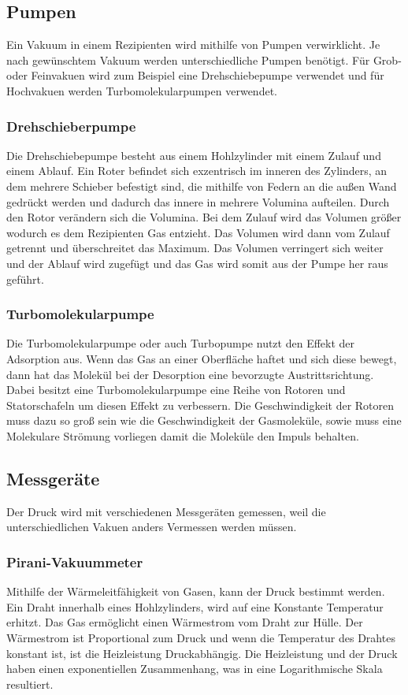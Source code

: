 \subsection{Pumpen}
Ein Vakuum in einem Rezipienten wird mithilfe von Pumpen verwirklicht. Je nach gewünschtem Vakuum werden unterschiedliche Pumpen benötigt. Für Grob- oder Feinvakuen wird zum Beispiel eine Drehschiebepumpe verwendet und für Hochvakuen werden Turbomolekularpumpen verwendet.
\subsubsection{Drehschieberpumpe}
Die Drehschiebepumpe besteht aus einem Hohlzylinder mit einem Zulauf und einem Ablauf. Ein Roter befindet sich exzentrisch im inneren des Zylinders, an dem mehrere Schieber befestigt sind, die mithilfe von Federn an die außen Wand gedrückt werden und dadurch das innere in mehrere Volumina aufteilen. Durch den Rotor verändern sich die Volumina. Bei dem Zulauf wird das Volumen größer wodurch es dem Rezipienten Gas entzieht. Das Volumen wird dann vom Zulauf getrennt und überschreitet das Maximum. Das Volumen verringert sich weiter und der Ablauf wird zugefügt und das Gas wird somit aus der Pumpe her raus geführt.

\subsubsection{Turbomolekularpumpe}
Die Turbomolekularpumpe oder auch Turbopumpe nutzt den Effekt der Adsorption aus. Wenn das Gas an einer Oberfläche haftet und sich diese bewegt, dann hat das Molekül bei der Desorption eine bevorzugte Austrittsrichtung. Dabei besitzt eine Turbomolekularpumpe eine Reihe von Rotoren und Statorschafeln um diesen Effekt zu verbessern. Die Geschwindigkeit der Rotoren muss dazu so groß sein wie die Geschwindigkeit der Gasmoleküle, sowie muss eine Molekulare Strömung vorliegen damit die Moleküle den Impuls behalten.
\subsection{Messgeräte}
Der Druck wird mit verschiedenen Messgeräten gemessen, weil die unterschiedlichen Vakuen anders Vermessen werden müssen.
\subsubsection{Pirani-Vakuummeter}
Mithilfe der Wärmeleitfähigkeit von Gasen, kann der Druck bestimmt werden. Ein Draht innerhalb eines Hohlzylinders, wird auf eine Konstante Temperatur erhitzt. Das Gas ermöglicht einen Wärmestrom vom Draht zur Hülle. Der Wärmestrom ist Proportional zum Druck und wenn die Temperatur des Drahtes konstant ist, ist die Heizleistung Druckabhängig. Die Heizleistung und der Druck haben einen exponentiellen Zusammenhang, was in eine Logarithmische Skala resultiert.
